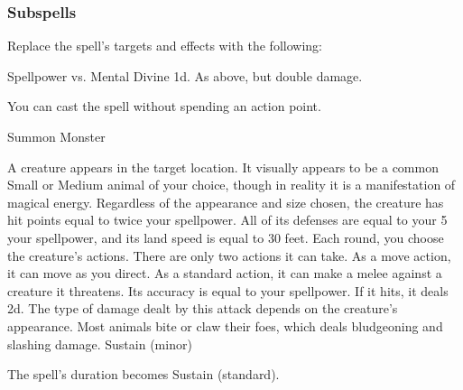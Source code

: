 \subsubsection{Subspells}
Replace the spell's targets and effects with the following:
\begin{spellcontent}
\begin{augmenttargetinginfo}
\end{augmenttargetinginfo}
\begin{augmenteffects}
\begin{spellattack}{Spellpower vs. Mental}
\spellsuccess Divine  \minus1d.
\spellcritical As above, but double damage.
\end{spellattack}
\end{augmenteffects}
\end{spellcontent}
You can cast the spell without spending an action point.
\begin{spellsection}{Summon Monster}
\begin{spellheader}
\end{spellheader}
\begin{spellcontent}
\begin{spelltargetinginfo}
\end{spelltargetinginfo}
\begin{spelleffects}
\spelleffect
A creature appears in the target location.
It visually appears to be a common Small or Medium animal of your choice, though in reality it is a manifestation of magical energy.
Regardless of the appearance and size chosen, the creature has hit points equal to twice your spellpower.
All of its defenses are equal to your 5 \add your spellpower, and its land speed is equal to 30 feet.
Each round, you choose the creature's actions.
There are only two actions it can take.
As a move action, it can move as you direct.
As a standard action, it can make a melee  against a creature it threatens.
Its accuracy is equal to your spellpower.
If it hits, it deals  \minus2d.
The type of damage dealt by this attack depends on the creature's appearance.
Most animals bite or claw their foes, which deals bludgeoning and slashing damage.
\spelldur Sustain (minor)
\end{spelleffects}
\end{spellcontent}
\begin{spellfooter}
\end{spellfooter}
\begin{spellsubcontent}
\begin{spellcantrip}
The spell's duration becomes Sustain (standard).
\end{spellcantrip}
\end{spellsubcontent}
\end{spellsection}
